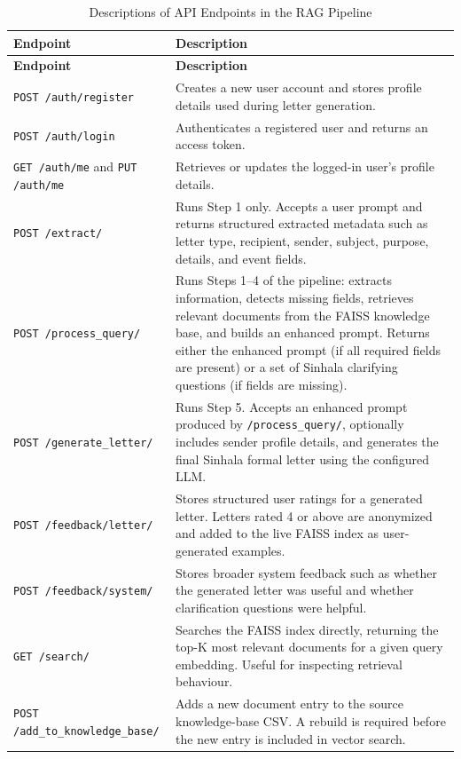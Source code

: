 \documentclass[12pt]{uomthesis}
\begin{document}
\small
\begin{longtable}{@{}p{4.5cm}p{10.1cm}@{}}
\caption{Descriptions of API Endpoints in the RAG Pipeline}
\label{tab:api_endpoints}\\
\toprule
\textbf{Endpoint} & \textbf{Description} \\
\midrule
\endfirsthead
\toprule
\textbf{Endpoint} & \textbf{Description} \\
\midrule
\endhead
\bottomrule
\endfoot
\texttt{POST /auth/register} &
Creates a new user account and stores profile details used during letter generation. \\
\midrule
\texttt{POST /auth/login} &
Authenticates a registered user and returns an access token. \\
\midrule
\texttt{GET /auth/me} and \texttt{PUT /auth/me} &
Retrieves or updates the logged-in user's profile details. \\
\midrule
\texttt{POST /extract/} &
Runs Step 1 only. Accepts a user prompt and returns structured extracted metadata such as letter type, recipient, sender, subject, purpose, details, and event fields. \\
\midrule
\texttt{POST /process\_query/} &
Runs Steps 1–4 of the pipeline: extracts information, detects missing fields, retrieves relevant documents from the FAISS knowledge base, and builds an enhanced prompt. Returns either the enhanced prompt (if all required fields are present) or a set of Sinhala clarifying questions (if fields are missing). \\
\midrule
\texttt{POST /generate\_letter/} &
Runs Step 5. Accepts an enhanced prompt produced by \texttt{/process\_query/}, optionally includes sender profile details, and generates the final Sinhala formal letter using the configured LLM. \\
\midrule
\texttt{POST /feedback/letter/} &
Stores structured user ratings for a generated letter. Letters rated 4 or above are anonymized and added to the live FAISS index as user-generated examples. \\
\midrule
\texttt{POST /feedback/system/} &
Stores broader system feedback such as whether the generated letter was useful and whether clarification questions were helpful. \\
\midrule
\texttt{GET /search/} &
Searches the FAISS index directly, returning the top-K most relevant documents for a given query embedding. Useful for inspecting retrieval behaviour. \\
\midrule
\texttt{POST /add\_to\_knowledge\_base/} &
Adds a new document entry to the source knowledge-base CSV. A rebuild is required before the new entry is included in vector search. \\

\end{longtable}
\end{document}
